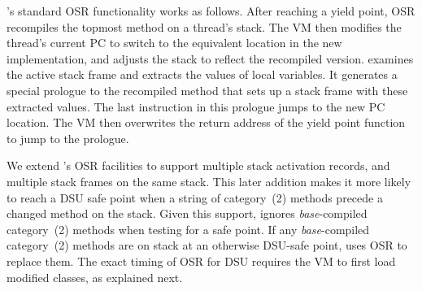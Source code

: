 \JikesRVM{}'s standard OSR functionality works as follows.
After reaching a yield point, OSR recompiles the 
topmost method on a thread's stack.  %
The VM then modifies the thread's current PC to switch to
the equivalent location in the new implementation, and adjusts the
stack to reflect the recompiled version.  \JikesRVM{}
examines the active stack frame and extracts the values of local
variables. It generates a special prologue to the recompiled method
that sets up a stack frame with these extracted values. The last instruction
in this prologue jumps to the new PC location. The VM then overwrites the
return address of the yield point function to jump to the prologue.

We  extend \JikesRVM's OSR facilities to support multiple stack
activation records, and multiple stack frames on the same stack. This later addition makes it more likely to reach a DSU safe point when a string of category~(2) methods precede a changed
method on the stack.
Given this support, \DSU{} ignores \emph{base}-compiled category~(2) methods
when testing for a safe point.  If any \emph{base}-compiled category~(2)
methods are on stack at an otherwise DSU-safe point, \DSU{} uses OSR
to replace them.  The exact timing of OSR for DSU requires the VM to
first load modified classes, as explained next.



